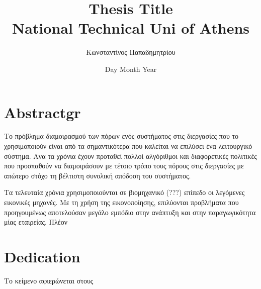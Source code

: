 \documentclass[12px]{report}
\title{
	{Thesis Title}\\
	{\large National Technical Uni of Athens}\\
}
\author{Κωνσταντίνος Παπαδημητρίου}
\date{Day Month Year}
\begin{document}
\chapter*{Abstractgr}
Το πρόβλημα διαμοιρασμού των πόρων ενός συστήματος στις διεργασίες που το
χρησιμοποιούν είναι από τα σημαντικότερα που καλείται να επιλύσει ένα
λειτουργικό σύστημα. Ανα τα χρόνια έχουν προταθεί πολλοί αλγόριθμοι και
διαφορετικές πολιτικές που προσπαθούν να διαμοιράσουν με τέτοιο τρόπο τους
πόρους στις διεργασίες με απώτερο στόχο τη βέλτιστη συνολική απόδοση του
συστήματος.
\par
Τα τελευταία χρόνια χρησιμοποιούνται σε βιομηχανικό (???) επίπεδο οι λεγόμενες εικονικές μηχανές. Με τη χρήση της
εικονοποίησης, επιλύονται προβλήματα που προηγουμένως αποτελούσαν μεγάλο εμπόδιο στην ανάπτυξη και στην παραγωγικότητα
μίας εταιρείας. Πλέον
\chapter*{Dedication}
Το κείμενο αφιερώνεται στους
\end{document}
